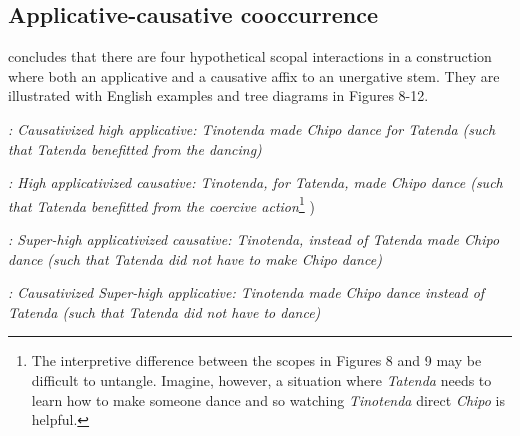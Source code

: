 \documentclass[output=paper]{langscibook}
\begin{document}
\subsection{Applicative-causative cooccurrence}\label{sec:wechsler:3.4}

\citet{Wechsler2016} concludes that there are four hypothetical scopal interactions in a construction where both an applicative and a causative affix to an unergative stem. They are illustrated with English examples and tree diagrams in Figures 8-12. 



  
 



\textit{: Causativized high applicative: Tinotenda made Chipo dance for Tatenda (such that Tatenda benefitted from the dancing)}




 

\textit{: High applicativized causative: Tinotenda, for Tatenda, made Chipo dance (such that Tatenda benefitted from the coercive action}\footnote{The interpretive difference between the scopes in Figures 8 and 9 may be difficult to untangle. Imagine, however, a situation where \textit{Tatenda} needs to learn how to make someone dance and so watching \textit{Tinotenda} direct \textit{Chipo} is helpful.} )



  
 



\textit{: Super-high applicativized causative: Tinotenda, instead of Tatenda made Chipo dance (such that Tatenda did not have to make Chipo dance)}



  
 



\textit{: Causativized Super-high applicative: Tinotenda made Chipo dance instead of Tatenda (such that Tatenda did not have to dance)}
\end{document}

